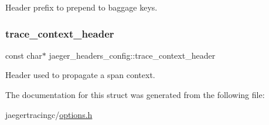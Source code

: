 Header prefix to prepend to baggage keys. 

\mbox{\label{structjaeger__headers__config_a5aee0f70ee5455509ee2839636369a83}} 
\subsubsection{\texorpdfstring{trace\+\_\+context\+\_\+header}{trace\_context\_header}}
{\footnotesize\ttfamily const char$\ast$ jaeger\+\_\+headers\+\_\+config\+::trace\+\_\+context\+\_\+header}



Header used to propagate a span context. 



The documentation for this struct was generated from the following file\+:\begin{DoxyCompactItemize}
\item 
jaegertracingc/\mbox{\hyperlink{options_8h}{options.\+h}}\end{DoxyCompactItemize}
